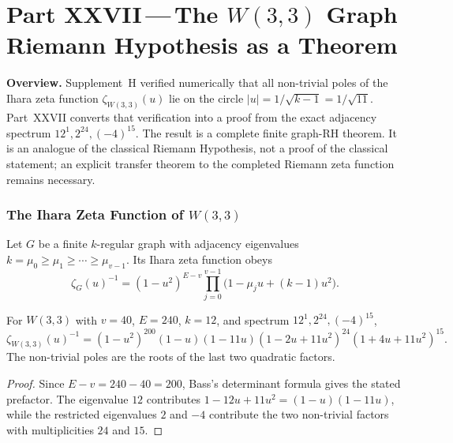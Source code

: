 
\part*{Part XXVII\,---\,The $W(3,3)$ Graph Riemann Hypothesis as a Theorem}

\bigskip
\noindent\textbf{Overview.}\;
Supplement~H verified numerically that all non-trivial poles of the
Ihara zeta function $\zeta_{W(3,3)}(u)$ lie on the circle
$|u|=1/\sqrt{k-1}=1/\sqrt{11}$.
Part~XXVII converts that verification into a proof from the exact
adjacency spectrum $12^1,2^{24},(-4)^{15}$.  The result is a complete
finite graph-RH theorem.  It is an analogue of the classical Riemann
Hypothesis, not a proof of the classical statement; an explicit transfer
theorem to the completed Riemann zeta function remains necessary.

\section{The Ihara Zeta Function of $W(3,3)$}
\label{sec:ihara}

\begin{definition}
Let $G$ be a finite $k$-regular graph with adjacency eigenvalues
$k=\mu_0\ge\mu_1\ge\cdots\ge\mu_{v-1}$.  Its Ihara zeta function obeys
\begin{equation}
  \zeta_G(u)^{-1}
  = (1-u^2)^{E-v}\prod_{j=0}^{v-1}
    \bigl(1-\mu_j u+(k-1)u^2\bigr).
  \label{eq:ihara}
\end{equation}
\end{definition}

\begin{proposition}
\label{prop:ihara_det}
For $W(3,3)$ with $v=40$, $E=240$, $k=12$, and spectrum
$12^1,2^{24},(-4)^{15}$,
\begin{equation}
  \zeta_{W(3,3)}(u)^{-1}
  = (1-u^2)^{200}
    (1-u)(1-11u)
    (1-2u+11u^2)^{24}
    (1+4u+11u^2)^{15}.
  \label{eq:ihara_w33}
\end{equation}
The non-trivial poles are the roots of the last two quadratic factors.
\end{proposition}

\begin{proof}
Since $E-v=240-40=200$, Bass's determinant formula gives the stated
prefactor.  The eigenvalue $12$ contributes
$1-12u+11u^2=(1-u)(1-11u)$, while the restricted eigenvalues $2$ and
$-4$ contribute the two non-trivial factors with multiplicities $24$
and $15$.
\end{proof}

